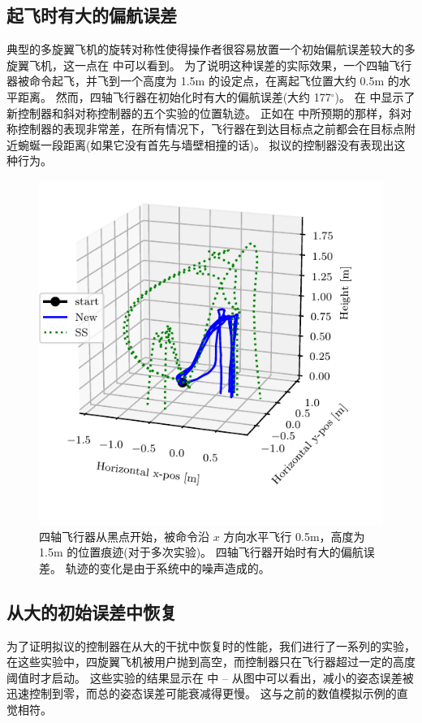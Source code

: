 \subsection{起飞时有大的偏航误差}
典型的多旋翼飞机的旋转对称性使得操作者很容易放置一个初始偏航误差较大的多旋翼飞机，这一点在  中可以看到。
为了说明这种误差的实际效果，一个四轴飞行器被命令起飞，并飞到一个高度为 1.5m 的设定点，在离起飞位置大约 0.5m 的水平距离。 
然而，四轴飞行器在初始化时有大的偏航误差(大约 177$^\circ$)。
在  中显示了新控制器和斜对称控制器的五个实验的位置轨迹。 
正如在  中所预期的那样，斜对称控制器的表现非常差，在所有情况下，飞行器在到达目标点之前都会在目标点附近蜿蜒一段距离(如果它没有首先与墙壁相撞的话)。 
拟议的控制器没有表现出这种行为。

\begin{figure}
  \centering
  \includegraphics{Figures/Experiments/YawErrTakeoff/fig_traces.pdf}
  \caption{
  四轴飞行器从黑点开始，被命令沿 $x$ 方向水平飞行 0.5m，高度为 1.5m 的位置痕迹(对于多次实验)。
  四轴飞行器开始时有大的偏航误差。
  轨迹的变化是由于系统中的噪声造成的。
  }
  \label{figExpYaw}
\end{figure}

\subsection{从大的初始误差中恢复}
为了证明拟议的控制器在从大的干扰中恢复时的性能，我们进行了一系列的实验，在这些实验中，四旋翼飞机被用户抛到高空，而控制器只在飞行器超过一定的高度阈值时才启动。
这些实验的结果显示在  中 -- 从图中可以看出，减小的姿态误差被迅速控制到零，而总的姿态误差可能衰减得更慢。 
这与之前的数值模拟示例的直觉相符。

